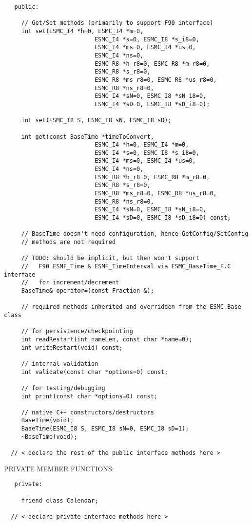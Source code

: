 \begin{verbatim} 
   public:
 
     // Get/Set methods (primarily to support F90 interface)
     int set(ESMC_I4 *h=0, ESMC_I4 *m=0,
                          ESMC_I4 *s=0, ESMC_I8 *s_i8=0,
                          ESMC_I4 *ms=0, ESMC_I4 *us=0,
                          ESMC_I4 *ns=0,
                          ESMC_R8 *h_r8=0, ESMC_R8 *m_r8=0,
                          ESMC_R8 *s_r8=0,
                          ESMC_R8 *ms_r8=0, ESMC_R8 *us_r8=0,
                          ESMC_R8 *ns_r8=0,
                          ESMC_I4 *sN=0, ESMC_I8 *sN_i8=0,
                          ESMC_I4 *sD=0, ESMC_I8 *sD_i8=0);
 
     int set(ESMC_I8 S, ESMC_I8 sN, ESMC_I8 sD);
 
     int get(const BaseTime *timeToConvert,
                          ESMC_I4 *h=0, ESMC_I4 *m=0,
                          ESMC_I4 *s=0, ESMC_I8 *s_i8=0,
                          ESMC_I4 *ms=0, ESMC_I4 *us=0,
                          ESMC_I4 *ns=0,
                          ESMC_R8 *h_r8=0, ESMC_R8 *m_r8=0,
                          ESMC_R8 *s_r8=0,
                          ESMC_R8 *ms_r8=0, ESMC_R8 *us_r8=0,
                          ESMC_R8 *ns_r8=0,
                          ESMC_I4 *sN=0, ESMC_I8 *sN_i8=0,
                          ESMC_I4 *sD=0, ESMC_I8 *sD_i8=0) const;
 
     // BaseTime doesn't need configuration, hence GetConfig/SetConfig
     // methods are not required
 
     // TODO: should be implicit, but then won't support
     //   F90 ESMF_Time & ESMF_TimeInterval via ESMC_BaseTime_F.C interface
     //   for increment/decrement
     BaseTime& operator=(const Fraction &);
 
     // required methods inherited and overridden from the ESMC_Base class
 
     // for persistence/checkpointing
     int readRestart(int nameLen, const char *name=0);
     int writeRestart(void) const;
 
     // internal validation
     int validate(const char *options=0) const;
 
     // for testing/debugging
     int print(const char *options=0) const;
 
     // native C++ constructors/destructors
     BaseTime(void);
     BaseTime(ESMC_I8 S, ESMC_I8 sN=0, ESMC_I8 sD=1);
     ~BaseTime(void);
 
  // < declare the rest of the public interface methods here >
 \end{verbatim}{\sf PRIVATE MEMBER FUNCTIONS:}
\begin{verbatim}   private:
 
     friend class Calendar;
 
  // < declare private interface methods here >\end{verbatim}

\setlength{\parskip}{\oldparskip}
\setlength{\parindent}{\oldparindent}
\setlength{\baselineskip}{\oldbaselineskip}
